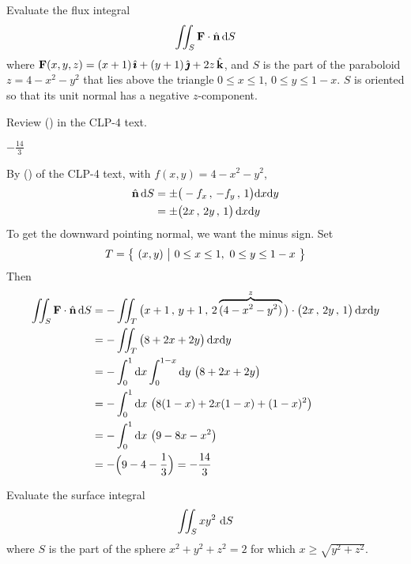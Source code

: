 \begin{question}[M317 2008A] %

Evaluate the flux integral
\begin{equation*}
\iint_S \mathbf{F} \cdot\hat{\mathbf{n}}\, \mathrm{d}S
\end{equation*}
where $\mathbf{F}(x, y, z) = (x+1)\,\hat{\pmb{\imath}}+(y +1)\,\hat{\pmb{\jmath}}+2z\,\hat{\mathbf{k}}$, and 
$S$ is the part of the paraboloid $z = 4-x^2 -y^2$
that lies above the triangle $0 \le x \le 1$, $0 \le y \le 1 - x$. 
$S$ is oriented so that its unit normal has a negative $z$-component.
\end{question}

\begin{hint} 
Review () in the CLP-4 text.
\end{hint}

\begin{answer} 
$-\frac{14}{3}$
\end{answer}

\begin{solution} 
By () of the CLP-4 text, with 
$f(x,y) = 4-x^2-y^2$, 
\begin{align*}
\hat{\mathbf{n}}\,\mathrm{d}S &=\pm \big(-f_x\,,\,-f_y\,,\, 1\big)\mathrm{d}x\mathrm{d}y \\
&=\pm\big(2x\,,\,2y\,,\, 1\big)\,\mathrm{d}x\mathrm{d}y 
\end{align*}
To get the downward pointing normal, we want the minus sign.
Set 
\begin{equation*}
T=\Set{(x,y)}{0\le x\le1,\ 0\le y\le 1-x}
\end{equation*}
Then
\begin{align*}
\iint_S \mathbf{F} \cdot\hat{\mathbf{n}}\, \mathrm{d}S
&=-\iint_T \big(x+1\,,\,y+1\,,\, 2\overbrace{(4-x^2-y^2)}^{z}\big) 
       \cdot\big(2x\,,\,2y\,,\, 1\big)\,\mathrm{d}x\mathrm{d}y  \\
&=-\iint_T \big(8+2x+2y\big)\,\mathrm{d}x\mathrm{d}y  \\
&=-\int_0^1\mathrm{d}x\int_0^{1-x}\mathrm{d}y\ \big(8+2x+2y\big)  \\
&=-\int_0^1\mathrm{d}x\ \big(8(1-x)+2x(1-x)+(1-x)^2\big)  \\
&=-\int_0^1\mathrm{d}x\ \big(9-8x-x^2\big)  \\
&=-\Big(9-4-\frac{1}{3}\Big)=-\frac{14}{3}
\end{align*}

\end{solution}

\begin{question}[M317 2007A] %
Evaluate the surface integral
\begin{equation*}
\iint_S xy^2\ \mathrm{d}S
\end{equation*}
where $S$ is the part of the sphere $x^2 + y^2 + z^2 = 2$ for which 
$x \ge \sqrt{y^2 + z^2}$.
\end{question}


